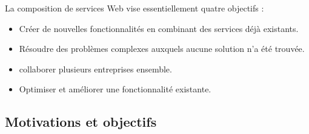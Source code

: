     La composition de services Web vise essentiellement quatre
    objectifs \cite{driss2011approche}:
    \begin{itemize}
      \item Créer de nouvelles fonctionnalités en combinant des services
        déjà existants.
      \item Résoudre des problèmes complexes auxquels aucune solution
        n'a été trouvée.
      \item collaborer plusieurs entreprises ensemble.
      \item Optimiser et améliorer une fonctionnalité existante.
    \end{itemize}

    

    \subsection{Motivations et objectifs}
    \label{sec:objectifs}
    

